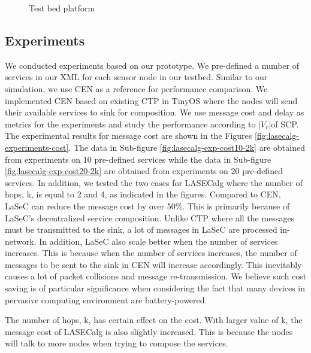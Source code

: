 \begin{figure}
\centering
{}
\qquad
{}
\caption{Test bed platform}
\label{fig:lasecalg-implementation-hardware}
\end{figure}

\subsection{Experiments}
We conducted experiments based on our prototype.  We pre-defined a number of services in our XML for each sensor node in our testbed. Similar to our simulation, we use CEN as a reference for performance comparison. We implemented CEN based on existing CTP in TinyOS where the nodes will send their available services to sink for composition. We use message cost and delay as metrics for the experiments and study the performance according to \(|V_r |\)of SCP. The experimental results for message cost are shown in the Figures \ref{fig:lasecalg-experiments-cost}. The data in Sub-figure \ref{fig:lasecalg-exp-cost10-2k} are obtained from experiments on 10 pre-defined services while the data in Sub-figure \ref{fig:lasecalg-exp-cost20-2k} are obtained from experiments on 20 pre-defined services. In addition, we tested the two cases for LASECalg where the number of hops, k, is equal to 2 and 4, as indicated in the figures. Compared to CEN, LaSeC can reduce the message cost by over 50\%. This is primarily because of LaSeC's decentralized service composition. Unlike CTP where all the messages must be transmitted to the sink, a lot of messages in LaSeC are processed in-network. In addition, LaSeC also scale better when the number of services increases. This is because when the number of services increases, the number of messages to be sent to the sink in CEN will increase accordingly. This inevitably causes a lot of packet collisions and message re-transmission.  We believe such cost saving is of particular significance when considering the fact that many devices in pervasive computing environment are battery-powered.

The number of hops, k, has certain effect on the cost. With larger value of k, the message cost of LASECalg is also slightly increased. This is because the nodes will talk to more nodes when trying to compose the services.

